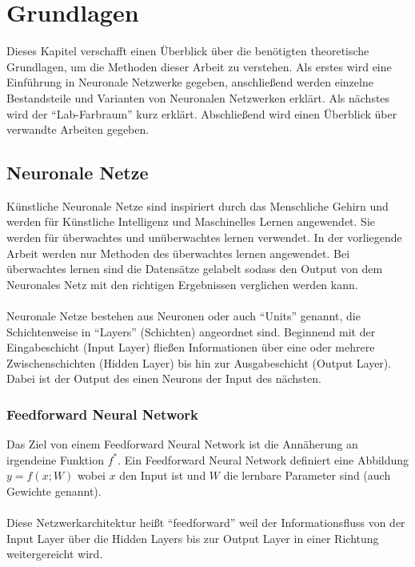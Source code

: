 \chapter{Grundlagen}
Dieses Kapitel verschafft einen Überblick über die benötigten theoretische Grundlagen, um die Methoden dieser Arbeit zu verstehen. 
Als erstes wird eine Einführung in Neuronale Netzwerke gegeben, anschließend werden
einzelne Bestandsteile und Varianten von Neuronalen Netzwerken erklärt. 
Als nächstes wird der ``Lab-Farbraum'' kurz erklärt. Abschließend wird einen Überblick über verwandte Arbeiten gegeben.

\section{Neuronale Netze}
Künstliche Neuronale Netze sind inspiriert durch das Menschliche Gehirn und werden für Künstliche Intelligenz und Maschinelles Lernen
angewendet. Sie werden für überwachtes und unüberwachtes lernen verwendet. In der vorliegende Arbeit werden nur Methoden des überwachtes 
lernen angewendet. Bei überwachtes lernen sind die Datensätze gelabelt sodass den Output von dem Neuronales Netz mit den richtigen Ergebnissen
verglichen werden kann.
\\
\\
Neuronale Netze bestehen aus Neuronen oder auch ``Units'' genannt, die Schichtenweise in ``Layers'' (Schichten) angeordnet sind.
Beginnend mit der Eingabeschicht (Input \gls{Layer}) fließen Informationen über eine oder mehrere Zwischenschichten (Hidden \gls{Layer}) bis hin zur 
Ausgabeschicht (Output \gls{Layer}). Dabei ist der Output des einen Neurons der Input des nächsten. \cite{neuronale-netze-aufbau}

\subsection{Feedforward Neural Network}
Das Ziel von einem Feedforward Neural Network ist die Annäherung an irgendeine Funktion $ f^* $. Ein Feedforward Neural Network definiert 
eine Abbildung $ y = f(x;W) $ wobei $ x $ den Input ist und $ W $ die lernbare Parameter sind (auch Gewichte genannt).
\cite[164-223]{Goodfellow-et-al-2016}
\\
\\
Diese Netzwerkarchitektur heißt ``feedforward'' weil der Informationsfluss von der Input \gls{Layer} über die Hidden Layers bis zur Output \gls{Layer} 
in einer Richtung weitergereicht wird.


